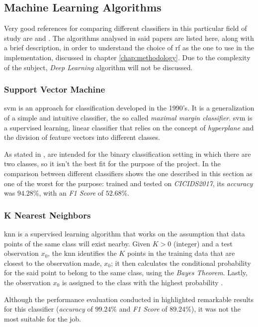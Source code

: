 
\subsection{Machine Learning Algorithms}
\label{subsec:ml-algorithms}

Very good references for comparing different classifiers in this particular field of study are \cite{icissp17} and \cite{Mozley2020}. The algorithms analysed in said papers are listed here, along with a brief description, in order to understand the choice of \gls{rf} as the one to use in the implementation, discussed in chapter \ref{chap:methodology}. Due to the complexity of the subject, \textit{Deep Learning} algorithm will not be discussed.

\subsubsection{Support Vector Machine}
\label{subsubsec:svm}

\gls{svm} is an approach for classification developed in the 1990's. It is a generalization of a simple and intuitive classifier, the so called \textit{maximal margin classifier}. \gls{svm} is a supervised learning, linear classifier that relies on the concept of \textit{hyperplane} and the division of feature vectors into different classes.
\par As stated in \cite[p. 341]{James2014},  are intended for the binary classification setting in which there are two classes, so it isn't the best fit for the purpose of the project. In \cite{Mozley2020} the comparison between different classifiers shows the one described in this section as one of the worst for the purpose: trained and tested on \textit{CICIDS2017}, its \textit{accuracy} was $94.28\%$, with an \textit{F1 Score} of $52.68\%$.

\subsubsection{K Nearest Neighbors}
\label{subsubsec:knn}

\gls{knn} is a supervised learning algorithm that works on the assumption that data points of the same class will exist nearby. Given $K>0$ (integer) and a test observation $x_0$, the \gls{knn} identifies the $K$ points in the training data that are closest to the observation made, $x_0$; it then calculates the conditional probability for the said point to belong to the same class, using the \textit{Bayes Theorem}. Lastly, the observation $x_0$ is assigned to the class with the highest probability \cite[p. 39]{James2014}.
\par Although the performance evaluation conducted in \cite{Mozley2020} highlighted remarkable results for this classifier (\textit{accuracy} of $99.24\%$ and \textit{F1 Score} of $89.24\%$), it was not the most suitable for the job.

